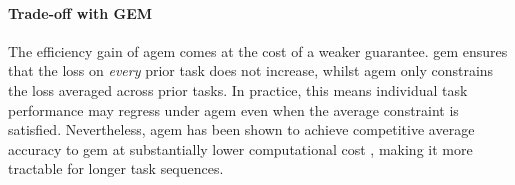 \paragraph{Trade-off with GEM}

The efficiency gain of \gls{agem} comes at the cost of a weaker guarantee.
\gls{gem} ensures that the loss on \emph{every} prior task does not increase,
whilst \gls{agem} only constrains the loss averaged across prior tasks. In
practice, this means individual task performance may regress under \gls{agem}
even when the average constraint is satisfied. Nevertheless, \gls{agem} has
been shown to achieve competitive average accuracy to \gls{gem} at substantially
lower computational cost \cite{AGEM}, making it more tractable for longer
task sequences.